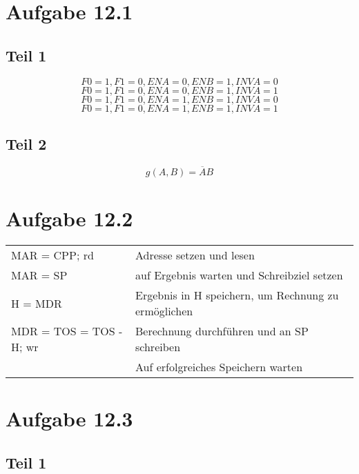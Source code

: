\documentclass[10pt,a4paper]{article}
\begin{document}
\section*{Aufgabe 12.1}

\subsection*{Teil 1}

\begin{equation}
F0 = 1, F1 = 0, ENA = 0, ENB = 1, INVA = 0
\end{equation}
\begin{equation}
F0 = 1, F1 = 0, ENA = 0, ENB = 1, INVA = 1
\end{equation}
\begin{equation}
F0 = 1, F1 = 0, ENA = 1, ENB = 1, INVA = 0
\end{equation}
\begin{equation}
F0 = 1, F1 = 0, ENA = 1, ENB = 1, INVA = 1
\end{equation}

\subsection*{Teil 2}

\begin{equation}
g(A, B) = \overline{A}B
\end{equation}

\section*{Aufgabe 12.2}

\begin{tabular}{l|l}
MAR = CPP; rd & Adresse setzen und lesen\\
MAR = SP & auf Ergebnis warten und Schreibziel setzen\\
H = MDR & Ergebnis in H speichern, um Rechnung zu ermöglichen\\
MDR = TOS = TOS - H; wr & Berechnung durchführen und an SP schreiben\\
 & Auf erfolgreiches Speichern warten\\
\end{tabular}

\section*{Aufgabe 12.3}

\subsection*{Teil 1}
\end{document}
